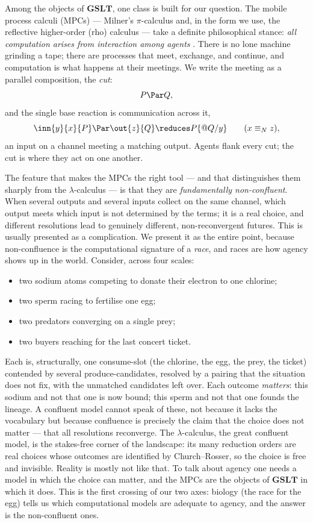 Among the objects of $\mathbf{GSLT}$, one class is built for our question. The mobile
process calculi (MPCs) --- Milner's $\pi$-calculus and, in the form we use, the
reflective higher-order (rho) calculus \cite{RHO} --- take a definite philosophical
stance: \emph{all computation arises from interaction among agents}
\cite{milnerCC}. There is no lone machine grinding a tape; there are processes that
meet, exchange, and continue, and computation is what happens at their meetings. We
write the meeting as a parallel composition, the \emph{cut}:
\[
P \Par Q,
\]
and the single base reaction is communication across it,
\[
\inn{y}{x}{P} \Par \out{z}{Q} \reduces P\{@Q/y\} \qquad (x \equiv_N z),
\]
an input on a channel meeting a matching output. Agents flank every cut; the cut is
where they act on one another.

The feature that makes the MPCs the right tool --- and that distinguishes them
sharply from the $\lambda$-calculus --- is that they are \emph{fundamentally
non-confluent}. When several outputs and several inputs collect on the same channel,
which output meets which input is not determined by the terms; it is a real choice,
and different resolutions lead to genuinely different, non-reconvergent futures.
This is usually presented as a complication. We present it as the entire point,
because non-confluence is the computational signature of a \emph{race}, and races
are how agency shows up in the world. Consider, across four scales:

\begin{itemize}[leftmargin=1.4em]
\item two sodium atoms competing to donate their electron to one chlorine;
\item two sperm racing to fertilise one egg;
\item two predators converging on a single prey;
\item two buyers reaching for the last concert ticket.
\end{itemize}

\noindent
Each is, structurally, one consume-slot (the chlorine, the egg, the prey, the
ticket) contended by several produce-candidates, resolved by a pairing that the
situation does not fix, with the unmatched candidates left over. Each outcome
\emph{matters}: this sodium and not that one is now bound; this sperm and not that
one founds the lineage. A confluent model cannot speak of these, not because it
lacks the vocabulary but because confluence is precisely the claim that the choice
does not matter --- that all resolutions reconverge. The $\lambda$-calculus, the
great confluent model, is the stakes-free corner of the landscape: its many
reduction orders are real choices whose outcomes are identified by Church--Rosser,
so the choice is free and invisible. Reality is mostly not like that. To talk about
agency one needs a model in which the choice can matter, and the MPCs are the
objects of $\mathbf{GSLT}$ in which it does. This is the first crossing of our two axes:
biology (the race for the egg) tells us which computational models are adequate to
agency, and the answer is the non-confluent ones.


